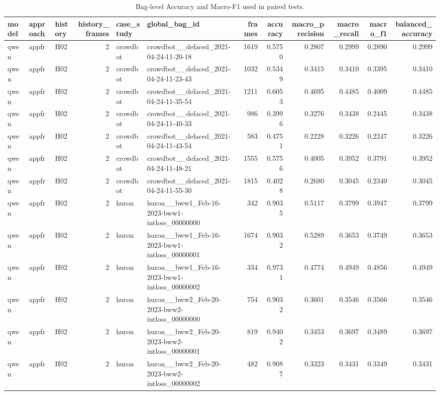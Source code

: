 \begin{table}[tbp]
\caption{Bag-level Accuracy and Macro-F1 used in paired tests.}
\label{tab:rq1_bag_metrics}
\begin{tabular}{lllrllrrrrrr}
\toprule
model & approach & history & history\_frames & case\_study & global\_bag\_id & frames & accuracy & macro\_precision & macro\_recall & macro\_f1 & balanced\_accuracy \\
\midrule
qwen & appfr & H02 & 2 & crowdbot & crowdbot\_\_defaced\_2021-04-24-11-20-18 & 1619 & 0.5750 & 0.2807 & 0.2999 & 0.2890 & 0.2999 \\
qwen & appfr & H02 & 2 & crowdbot & crowdbot\_\_defaced\_2021-04-24-11-23-43 & 1032 & 0.5349 & 0.3415 & 0.3410 & 0.3395 & 0.3410 \\
qwen & appfr & H02 & 2 & crowdbot & crowdbot\_\_defaced\_2021-04-24-11-35-54 & 1211 & 0.6053 & 0.4695 & 0.4485 & 0.4009 & 0.4485 \\
qwen & appfr & H02 & 2 & crowdbot & crowdbot\_\_defaced\_2021-04-24-11-40-33 & 986 & 0.3996 & 0.3276 & 0.3438 & 0.2445 & 0.3438 \\
qwen & appfr & H02 & 2 & crowdbot & crowdbot\_\_defaced\_2021-04-24-11-43-54 & 583 & 0.4751 & 0.2228 & 0.3226 & 0.2247 & 0.3226 \\
qwen & appfr & H02 & 2 & crowdbot & crowdbot\_\_defaced\_2021-04-24-11-48-21 & 1555 & 0.5756 & 0.4005 & 0.3952 & 0.3791 & 0.3952 \\
qwen & appfr & H02 & 2 & crowdbot & crowdbot\_\_defaced\_2021-04-24-11-55-30 & 1815 & 0.4028 & 0.2680 & 0.3045 & 0.2340 & 0.3045 \\
qwen & appfr & H02 & 2 & huron & huron\_\_bww1\_Feb-16-2023-bww1-intloss\_00000000 & 342 & 0.9035 & 0.5117 & 0.3799 & 0.3947 & 0.3799 \\
qwen & appfr & H02 & 2 & huron & huron\_\_bww1\_Feb-16-2023-bww1-intloss\_00000001 & 1674 & 0.9032 & 0.5289 & 0.3653 & 0.3749 & 0.3653 \\
qwen & appfr & H02 & 2 & huron & huron\_\_bww1\_Feb-16-2023-bww1-intloss\_00000002 & 334 & 0.9731 & 0.4774 & 0.4949 & 0.4856 & 0.4949 \\
qwen & appfr & H02 & 2 & huron & huron\_\_bww2\_Feb-20-2023-bww2-intloss\_00000000 & 754 & 0.9032 & 0.3601 & 0.3546 & 0.3566 & 0.3546 \\
qwen & appfr & H02 & 2 & huron & huron\_\_bww2\_Feb-20-2023-bww2-intloss\_00000001 & 819 & 0.9402 & 0.3453 & 0.3697 & 0.3489 & 0.3697 \\
qwen & appfr & H02 & 2 & huron & huron\_\_bww2\_Feb-20-2023-bww2-intloss\_00000002 & 482 & 0.9087 & 0.3323 & 0.3431 & 0.3349 & 0.3431 \\

\end{tabular}
\end{table}
